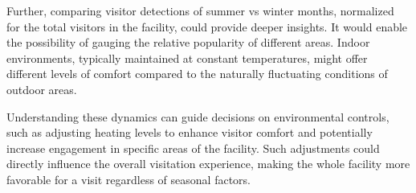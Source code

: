 Further, comparing visitor detections of summer vs winter months, normalized for the total visitors in the facility, could provide deeper insights. It would enable the possibility of gauging the relative popularity of different areas. Indoor environments, typically maintained at constant temperatures, might offer different levels of comfort compared to the naturally fluctuating conditions of outdoor areas. 

Understanding these dynamics can guide decisions on environmental controls, such as adjusting heating levels to enhance visitor comfort and potentially increase engagement in specific areas of the facility. Such adjustments could directly influence the overall visitation experience, making the whole facility more favorable for a visit regardless of seasonal factors.
